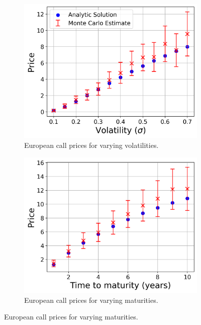 \begin{figure}[H]
    \centering

    \begin{subfigure}[b]{0.45\linewidth}
        \centering
        \includegraphics[width=\linewidth]{graphics/validation_mc_european_call_vol.png}
        \caption{European call prices for varying volatilities.}
        \label{fig:eu_call_vol}
    \end{subfigure}
    \hfill
    \begin{subfigure}[b]{0.45\linewidth}
        \centering
        \includegraphics[width=\linewidth]{graphics/validation_mc_european_call_T.png}
        \caption{European call prices for varying maturities.}
        \label{fig:eu_call_T}
    \end{subfigure}


\end{figure}
